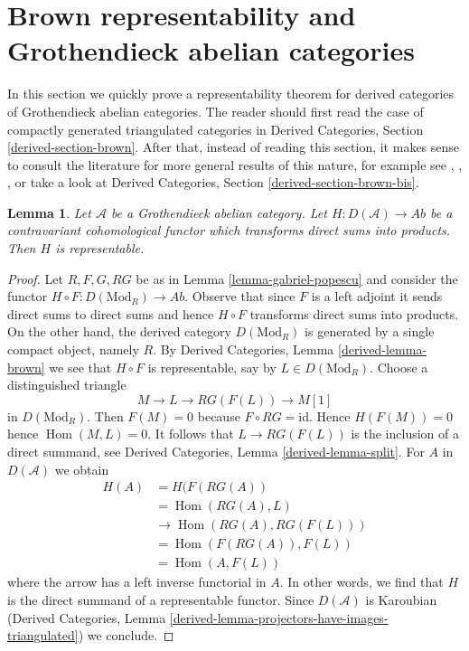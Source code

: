 \documentclass{stacks-project}
\theoremstyle{plain}
\newtheorem{lemma}[subsection]{Lemma}
\theoremstyle{definition}
\theoremstyle{remark}
\numberwithin{equation}{subsection}
\def\Hom{\mathop{\mathrm{Hom}}\nolimits}
\begin{document}
\section{Brown representability and Grothendieck abelian categories}
\label{section-brown}

\noindent
In this section we quickly prove a representability theorem for
derived categories of Grothendieck abelian categories. The reader should
first read the case of compactly generated triangulated categories in
Derived Categories, Section \ref{derived-section-brown}.
After that, instead of reading this section,
it makes sense to consult the literature for more
general results of this nature, for example see
\cite{Franke}, \cite{Neeman}, \cite{Krause}, or take
a look at Derived Categories, Section \ref{derived-section-brown-bis}.

\begin{lemma}
\label{lemma-brown}
Let $\mathcal{A}$ be a Grothendieck abelian category.
Let $H : D(\mathcal{A}) \to \textit{Ab}$ be a contravariant
cohomological functor which transforms direct sums into products.
Then $H$ is representable.
\end{lemma}

\begin{proof}
Let $R, F, G, RG$ be as in Lemma \ref{lemma-gabriel-popescu}
and consider the functor $H \circ F : D(\text{Mod}_R) \to \textit{Ab}$.
Observe that since $F$ is a left adjoint it sends direct sums to
direct sums and hence $H \circ F$ transforms direct sums into products.
On the other hand, the derived category $D(\text{Mod}_R)$ is
generated by a single compact object, namely $R$.
By Derived Categories, Lemma \ref{derived-lemma-brown}
we see that $H \circ F$ is representable, say by $L \in D(\text{Mod}_R)$.
Choose a distinguished triangle
$$
M \to L \to RG(F(L)) \to M[1]
$$
in $D(\text{Mod}_R)$. Then $F(M) = 0$ because $F \circ RG = \text{id}$.
Hence $H(F(M)) = 0$ hence $\Hom(M, L) = 0$.
It follows that $L \to RG(F(L))$ is the inclusion of a direct summand, see
Derived Categories, Lemma \ref{derived-lemma-split}.
For $A$ in $D(\mathcal{A})$ we obtain
\begin{align*}
H(A)
& =
H(F(RG(A)) \\
& =
\Hom(RG(A), L) \\
& \to
\Hom(RG(A), RG(F(L))) \\
& =
\Hom(F(RG(A)), F(L)) \\
& =
\Hom(A, F(L))
\end{align*}
where the arrow has a left inverse functorial in $A$. In other words, we find
that $H$ is the direct summand of a representable functor.
Since $D(\mathcal{A})$ is Karoubian
(Derived Categories, Lemma
\ref{derived-lemma-projectors-have-images-triangulated}) we conclude.
\end{proof}
\end{document}
